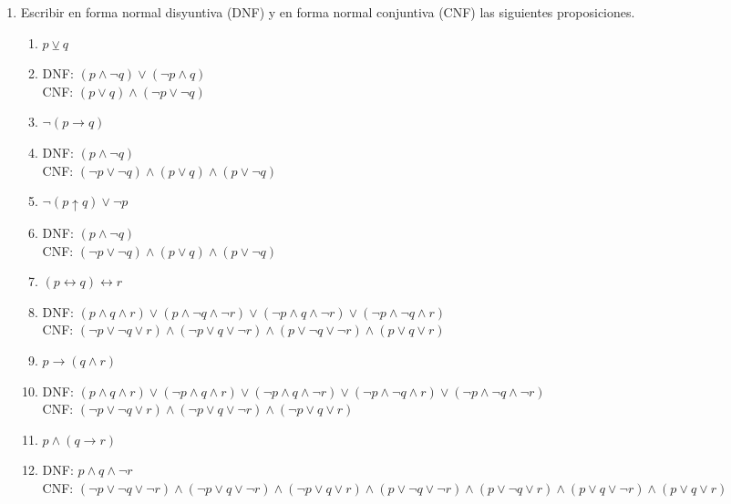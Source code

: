 \documentclass[a4paper]{article}
\newcommand{\Item}{\item[\stepcounter{enumii}$\blacktriangleright$\textbf{(\alph{enumii})}]} %
\newcommand{\answer}{\item[**]}
\newcommand{\exercise}{\item}
\newcommand{\then}{\to}
\newcommand{\eq}{\leftrightarrow}
\newcommand{\xor}{\veebar}
\newcommand{\nand}{\uparrow}
\newcommand{\Eq}{\Leftrightarrow}
\begin{document}
\begin{enumerate}
\begin{multicols}{2}
\begin{enumerate} [label=(\alph*)]
		\item $p\then (q\land r\land s) \Eq (p\then q)\land (p\then r)\land (p\then s)$
		\answer La \href{https://www.wolframalpha.com/input?i=truth+table%3A+%28p+%3D%3E+%28q+and+r+and+s%29%29+%3C%3D%3E+%28%28p+%3D%3E+q%29+and+%28p+%3D%3E+r%29+and+%28p+%3D%3E+s%29%29}{tabla de verdad} revela que es una tautología. Por lo tanto, son equivalentes. Esta regla de equivalencia no tiene nombre.

	\end{enumerate}
	\end{multicols}

	\exercise Escribir en forma normal disyuntiva (DNF) y en forma normal conjuntiva (CNF) las siguientes proposiciones.
	\begin{multicols}{2}
	\begin{enumerate} [label=(\alph*)]

		\item $p\xor q$
		\answer DNF: $(p\land \neg q) \lor  (\neg p\land q)$ \\ CNF: $(p\lor q) \land  (\neg p\lor \neg q)$

		\item $\neg (p\then q)$
		\answer DNF: $(p\land \neg q)$  \\ CNF: $(\neg p\lor \neg q) \land  (p\lor q) \land  (p\lor \neg q)$

		\Item $\neg (p \nand q) \lor \neg p$
		\answer DNF: $(p\land \neg q)$  \\ CNF: $(\neg p\lor \neg q) \land  (p\lor q) \land  (p\lor \neg q)$
		
		\item $(p \eq  q) \eq r$
		\answer DNF: $(p\land q\land r) \lor  (p\land \neg q\land \neg r) \lor  (\neg p\land q\land \neg r) \lor  (\neg p\land \neg q\land r)$  \\ CNF: $(\neg p\lor \neg q\lor r) \land  (\neg p\lor q\lor \neg r) \land  (p\lor \neg q\lor \neg r) \land  (p\lor q\lor r)$

		\Item $p\then  (q\land r)$
		\answer DNF: $(p\land q\land r) \lor  (\neg p\land q\land r) \lor  (\neg p\land q\land \neg r) \lor  (\neg p\land \neg q\land r) \lor  (\neg p\land \neg q\land \neg r)$  \\ CNF: $(\neg p\lor \neg q\lor r) \land  (\neg p\lor q\lor \neg r) \land  (\neg p\lor q\lor r)$

		\item $p \land (q \then r)$
		\answer DNF: $p \land q \land \neg r$ \\ CNF: $(\neg p \lor \neg q \lor \neg r)\land (\neg p \lor q \lor \neg r)\land (\neg p \lor q \lor r)\land (p \lor \neg q \lor \neg r)\land (p \lor \neg q \lor r)\land (p \lor q \lor \neg r)\land (p \lor q \lor r)$


\end{enumerate}
\end{multicols}
\end{enumerate}
\end{document}
